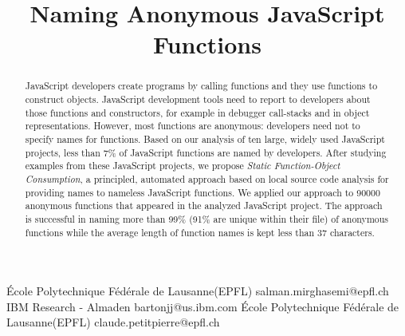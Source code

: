 \documentclass[10pt, preprint]{sigplanconf}
\begin{document}
\copyrightdata{[to be supplied]} 


\title{Naming Anonymous JavaScript Functions}

           {\'Ecole Polytechnique F\'ed\'erale de Lausanne(EPFL)}
           {salman.mirghasemi@epfl.ch}
           {IBM Research - Almaden}
           {bartonjj@us.ibm.com} 
           {\'Ecole Polytechnique F\'ed\'erale de Lausanne(EPFL)}
           {claude.petitpierre@epfl.ch}

\maketitle

\begin{abstract}
JavaScript developers create programs by calling functions and they use functions to construct objects. JavaScript development tools need to report to developers about those functions and constructors, for example in debugger call-stacks and in object representations. However, most functions are anonymous: developers need not to specify names for functions.  
 Based on our analysis of ten large, widely used JavaScript projects, less than 7\% of JavaScript functions are named by developers. 
After studying examples from these JavaScript projects, we propose \textit{Static Function-Object Consumption}, a principled, automated approach based on local source code analysis for providing names to nameless JavaScript functions. We applied our approach to 90000 anonymous functions that appeared in the analyzed JavaScript project. The approach is successful in naming more than 99\% (91\% are unique within their file) of anonymous functions while the average length of function names is kept less than 37 characters.%

\end{abstract}
\end{document}
